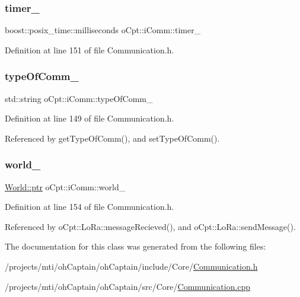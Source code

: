 \subsubsection{\texorpdfstring{timer\+\_\+}{timer\_}}
{\footnotesize\ttfamily boost\+::posix\+\_\+time\+::milliseconds o\+Cpt\+::i\+Comm\+::timer\+\_\+\hspace{0.3cm}{\ttfamily [protected]}}



Definition at line 151 of file Communication.\+h.

\hypertarget{classo_cpt_1_1i_comm_a4805d3c40171aa763f029ebe1886e24f}{}\label{classo_cpt_1_1i_comm_a4805d3c40171aa763f029ebe1886e24f} 
\subsubsection{\texorpdfstring{type\+Of\+Comm\+\_\+}{typeOfComm\_}}
{\footnotesize\ttfamily std\+::string o\+Cpt\+::i\+Comm\+::type\+Of\+Comm\+\_\+\hspace{0.3cm}{\ttfamily [protected]}}



Definition at line 149 of file Communication.\+h.



Referenced by get\+Type\+Of\+Comm(), and set\+Type\+Of\+Comm().

\hypertarget{classo_cpt_1_1i_comm_a982de4fc52aa87006fc29a0b4667b231}{}\label{classo_cpt_1_1i_comm_a982de4fc52aa87006fc29a0b4667b231} 
\subsubsection{\texorpdfstring{world\+\_\+}{world\_}}
{\footnotesize\ttfamily \hyperlink{classo_cpt_1_1_world_aa6e591e3096d5de71e0cec9039663d67}{World\+::ptr} o\+Cpt\+::i\+Comm\+::world\+\_\+\hspace{0.3cm}{\ttfamily [protected]}}



Definition at line 154 of file Communication.\+h.



Referenced by o\+Cpt\+::\+Lo\+Ra\+::message\+Recieved(), and o\+Cpt\+::\+Lo\+Ra\+::send\+Message().



The documentation for this class was generated from the following files\+:\begin{DoxyCompactItemize}
\item 
/projects/mti/oh\+Captain/oh\+Captain/include/\+Core/\hyperlink{_communication_8h}{Communication.\+h}\item 
/projects/mti/oh\+Captain/oh\+Captain/src/\+Core/\hyperlink{_communication_8cpp}{Communication.\+cpp}\end{DoxyCompactItemize}
